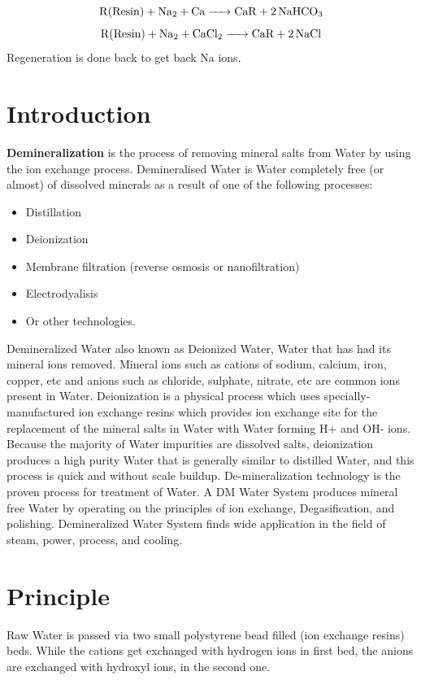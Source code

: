 \documentclass[english,11pt]{report}
\begin{document}
$$\ce{R(Resin) + Na2 + Ca -> CaR + 2NaHCO3}$$
$$\ce{R(Resin) + Na2 + CaCl2 -> CaR + 2NaCl}$$
Regeneration is done back to get back Na ions.
\section{Introduction}
\textbf{Demineralization} is the process of removing mineral salts from Water by using the ion exchange process.
Demineralised Water is Water completely free (or almost) of dissolved minerals as a result of one of the following processes:
\begin{itemize}
    \item Distillation
    \item Deionization
    \item Membrane filtration (reverse osmosis or nanofiltration)
    \item Electrodyalisis
    \item Or other technologies.
\end{itemize}
Demineralized Water also known as Deionized Water, Water that has had its mineral ions removed. Mineral ions such as cations of sodium, calcium, iron, copper, etc and anions such as chloride, sulphate, nitrate, etc are common ions present in Water. Deionization is a physical process which uses specially-manufactured ion exchange resins which provides ion exchange site for the replacement of the mineral salts in Water with Water forming H+ and OH- ions. Because the majority of Water impurities are dissolved salts, deionization produces a high purity Water that is generally similar to distilled Water, and this process is quick and without scale buildup. De-mineralization technology is the proven process for treatment of Water. A DM Water System produces mineral free Water by operating on the principles of ion exchange, Degasification, and polishing. Demineralized Water System finds wide application in the field of steam, power, process, and cooling.

\section{Principle}
Raw Water is passed via two small polystyrene bead filled (ion exchange resins) beds. While the cations get exchanged with hydrogen ions in first bed, the anions are exchanged with hydroxyl ions, in the second one.
\end{document}
